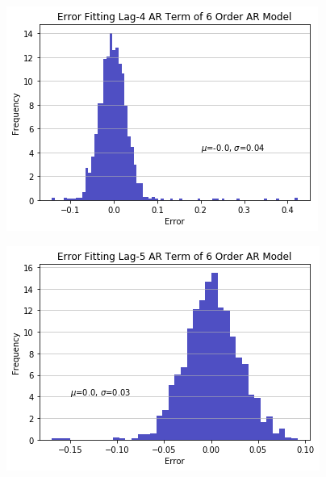\documentclass[oneside,12pt,openany]{book}
\begin{document}
	\begin{figure}[!ht]
		\centering
		\includegraphics[width=.85\linewidth]{images/ARModelARLag4CoefDist.png}
	\end{figure}
	\begin{figure}[!ht]
		\centering
		\includegraphics[width=.85\linewidth]{images/ARModelARLag5CoefDist.png}
	\end{figure}
	
\end{document}
